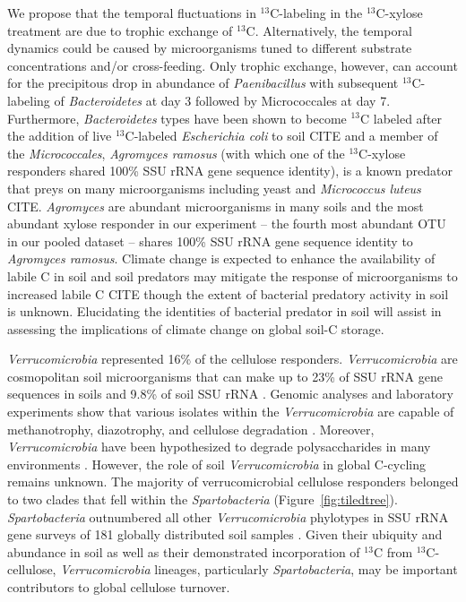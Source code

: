 We propose that the temporal fluctuations in $^{13}$C-labeling in the
$^{13}$C-xylose treatment are due to trophic exchange of $^{13}$C.
Alternatively, the temporal dynamics could be caused by microorganisms tuned to
different substrate concentrations and/or cross-feeding. Only trophic exchange,
however, can account for the precipitous drop in abundance of
\textit{Paenibacillus} with subsequent $^{13}$C-labeling of \textit{Bacteroidetes} at
day 3 followed by Micrococcales at day 7.  Furthermore, \textit{Bacteroidetes} types
have been shown to become $^{13}$C labeled after the addition of live
$^{13}$C-labeled \textit{Escherichia coli} to soil CITE and a member of the
\textit{Micrococcales}, \textit{Agromyces ramosus} (with which one of the $^{13}$C-xylose
responders shared 100\% SSU rRNA gene sequence identity), is a known predator
that preys on many microorganisms including yeast and \textit{Micrococcus
luteus} CITE. \textit{Agromyces} are abundant microorganisms in many soils and
the most abundant xylose responder in our experiment -- the fourth most abundant OTU in our pooled
dataset -- shares 100\% SSU rRNA gene sequence identity to \textit{Agromyces
ramosus}. Climate change is expected to enhance the availability of
labile C in soil and soil predators may mitigate the response of microorganisms
to increased labile C CITE though the extent of bacterial predatory 
activity in soil is unknown. Elucidating the identities of bacterial
predator in soil will assist in assessing the implications of climate change
on global soil-C storage.

\textit{Verrucomicrobia} represented 16\% of the cellulose responders.
\textit{Verrucomicrobia} are cosmopolitan soil microorganisms \citep{Bergmann_2011}
that can make up to 23\% of SSU rRNA gene sequences in soils
\citep{Bergmann_2011} and 9.8\% of soil SSU rRNA \citep{Buckley_2001}. Genomic
analyses and laboratory experiments show that various isolates within the
\textit{Verrucomicrobia} are capable of methanotrophy, diazotrophy, and
cellulose degradation \citep{Wertz_2011,Otsuka_2012}. Moreover,
\textit{Verrucomicrobia} have been hypothesized to degrade polysaccharides in
many environments \citep{Fierer_2013,10543821,Herlemann_2013}. However, the
role of soil \textit{Verrucomicrobia} in global C-cycling remains unknown. The
majority of verrucomicrobial cellulose responders belonged to two clades that
fell within the \textit{Spartobacteria} (Figure~\ref{fig:tiledtree}).
\textit{Spartobacteria} outnumbered all other \textit{Verrucomicrobia}
phylotypes in SSU rRNA gene surveys of 181 globally distributed soil samples
\citep{Bergmann_2011}. Given their ubiquity and abundance
in soil as well as their demonstrated incorporation of $^{13}$C from
$^{13}$C-cellulose, \textit{Verrucomicrobia} lineages, particularly
\textit{Spartobacteria}, may be important contributors to global cellulose
turnover. 


